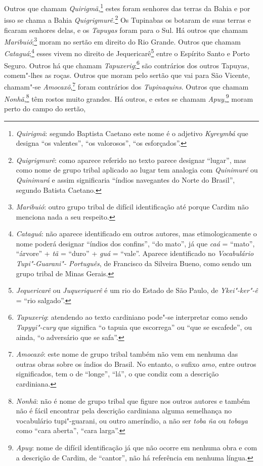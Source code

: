  Outros que chamam \textit{Quirigmã},\footnote{ \textit{Quirigmã}:  
segundo Baptista Caetano este nome é o adjetivo \textit{Kyreymbá} que
designa ``os valentes'', ``os valorosos'', ``os esforçados''.} estes
foram senhores das terras da Bahia e por isso se chama a Bahia
\textit{Quigrigmurê.}\footnote{ \textit{Quigrigmurê}: como aparece
referido no texto parece designar ``lugar'', mas como nome de grupo
tribal aplicado ao lugar tem analogia com \textit{Quinimuré} ou
\textit{Quinimurá} e assim significaria ``índios navegantes do Norte do
Brasil'', segundo Batista Caetano.} Os Tupinabas os botaram de
suas terras e ficaram senhores delas, e os \textit{Tapuyas} foram para
o Sul. Há outros que chamam \textit{Maribuió};\footnote{ \textit{Maribuió}: 
outro grupo tribal de difícil identificação até
porque Cardim não menciona nada a seu respeito.} moram no
sertão em direito do Rio Grande. Outros que chamam 
\textit{Cataguá};\footnote{ \textit{Cataguá}: não aparece identificado em outros
autores, mas etimologicamente o nome poderá designar ``índios dos
confins'', ``do mato'', já que \textit{caá} = ``mato'', ``árvore'' +
\textit{tã} = ``duro'' + \textit{guá} = ``vale''. Aparece identificado no
\textit{Vocabulário Tupi"-Guarani"- Português}, de Francisco da Silveira
Bueno, como sendo um grupo tribal de Minas Gerais.} esses
vivem no direito de Jequericarê\footnote{ \textit{Jequericarê} ou
\textit{Juqueriquerê} é um rio do Estado de São Paulo, de
\textit{Ykei"-ker"-ê} = ``rio salgado''.} entre o Espírito Santo e Porto
Seguro. Outros há que chamam 
\textit{Tapuxerig};\footnote{ \textit{Tapuxerig}: atendendo ao texto 
cardiniano pode"-se interpretar
como sendo \textit{Tapyyi"-cury} que significa ``o tapuia que escorrega''
ou ``que se escafede'', ou ainda, ``o adversário que se safa''.} 
são contrários dos outros Tapuyas, comem"-lhes as roças. Outros que
moram pelo sertão que vai para São Vicente, chamam"-se
\textit{Amocaxô},\footnote{ \textit{Amocaxô}: este nome de grupo
tribal também não vem em nenhuma das outras obras sobre os índios do
Brasil. No entanto, o sufixo \textit{amo}, entre outros significados,
tem o de ``longe'', ``lá'', o que condiz com a descrição
cardiniana.} foram contrários dos \textit{Tupinaquins}. Outros
que chamam \textit{Nonhã},\footnote{ \textit{Nonhã}: não é nome de
grupo tribal que figure nos outros autores e também não é fácil
encontrar pela descrição cardiniana alguma semelhança no vocabulário
tupi"-guarani, ou outro ameríndio, a não ser \textit{toba ña} ou
\textit{tobaya} como ``cara aberta'', ``cara larga''.} têm rostos
muito grandes. Há outros, e estes se chamam \textit{Apuy},\footnote{ \textit{Apuy}: 
nome de difícil identificação já que não ocorre em
nenhuma obra e com a descrição de Cardim, de ``cantor'', não há
referência em nenhuma língua.} moram perto do campo do sertão,
